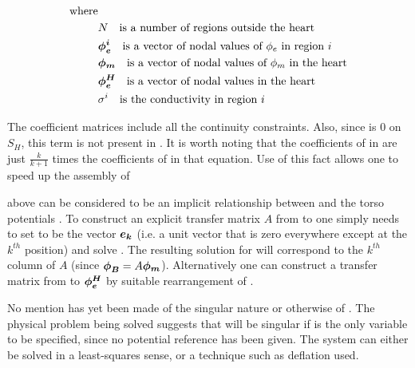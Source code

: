 \begin{equation*}
\begin{split}
\text{where} & \\
\quad\quad &N   \quad \text{is a number of regions outside the heart} \\
                &\vect{\expot^i}
                                \quad \text{is a vector of nodal values of \expot in region $i$}\\
                &\vect{\tranpot}
                                \quad \text{is a vector of nodal values of \tranpot in the heart}\\
                &\vect{\expot^{\uppercase{H}}}
                                \quad \text{is a vector of nodal values in the heart}   \\
                &\sigma^i       \quad \text{is the conductivity in region $i$}          
\end{split}
\end{equation*}


The coefficient matrices include all the continuity constraints. Also, since
 is $0$ on $S_H$, this term is not present in
. It is worth noting
that the coefficients of \vect{\tranpot} in  are just
$\frac{k}{k+1}$ times the coefficients of  in that equation.  Use
of this fact allows one to speed up the assembly of 

 above can be considered to be an implicit
relationship between \vect{\tranpot} and the torso potentials \vect{\bodypot}.
To construct an explicit transfer matrix $A$ from \vect{\tranpot} to 
\vect{\bodypot} one simply needs to set \vect{\tranpot} to be the vector 
$\vect{e_{k}}$ (i.e. a unit vector that is zero everywhere except at the $k^{th}$
position) and solve . The resulting solution for
\vect{\bodypot} will correspond to the $k^{th}$ column of $A$ 
(since $\vect{\bodypot} = A \vect{\tranpot}$).
Alternatively one can construct a transfer matrix from \vect{\tranpot}
to $\vect{\expot^{\uppercase{H}}}$ by suitable rearrangement of
. 

No mention has yet been made of the singular nature or otherwise of
. The physical problem being solved suggests that
 will be singular if \vect{\tranpot} is the only variable to be 
specified, since no potential reference has been given. The system can either be
solved in a least-squares sense, or a technique such as deflation used. 

